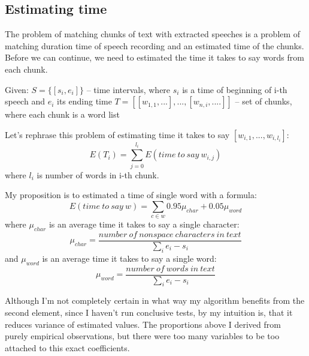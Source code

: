\documentclass[12pt,a4paper,english]{article}
\begin{document}
\newpage

\subsection{Estimating time}

The problem of matching chunks of text with extracted speeches is a problem of matching duration time of speech recording and
an estimated time of the chunks. Before we can continue, we need to estimated the time it takes to say words from each chunk. \newline

Given: \newline
	 $S=\{[s_i, e_i]\}$	– time intervals, where $s_i$ is a time of beginning of i-th speech and $e_i$ its ending time  \newline
	 $T = [[w_{1, 1}, ...], ..., [w_{n, i}, ....] ]$	– set of chunks, where each chunk is a word list \newline

Let's rephrase this problem of estimating time it takes to say $[w_{i, 1}, ..., w_{i, l_i}]$:
\begin {equation}
    E(T_i) = \sum_{j=0}^{l_i} E(time \: to \: say \: w_{i, j})
\end {equation}
where $l_i$ is number of words in i-th chunk. \newline

My proposition is to estimated a time of single word with a formula:
\begin {equation}
    E(time \: to \: say \: w) = \sum_{c \in w} 0.95 \mu_{char} + 0.05 \mu_{word}
\end {equation}
where  $\mu_{char}$ is an average time it takes to say a single character:
\begin {equation}
    \mu_{char} = \frac {number \: of \: nonspace \: characters \: in \: text} {\sum_i e_i - s_i}
\end {equation}
and $\mu_{word}$ is an average time it takes to say a single word:
\begin {equation}
    \mu_{word} = \frac {number \: of \: words \: in \: text} {\sum_i e_i - s_i}
\end {equation}
	
Although I'm not completely certain in what way my algorithm benefits from the second element,
since I haven't run conclusive tests, by my intuition is, that it reduces variance of estimated values. \newline
The proportions above I derived from purely empirical observations, but there were too many variables to be
too attached to this exact coefficients.
\end{document}
